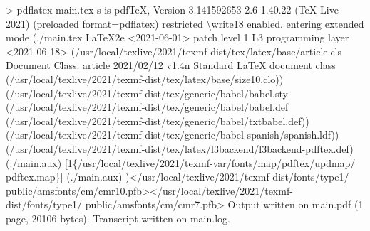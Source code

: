 \documentclass[
  letterpaper,
  DIV=11,
  numbers=noendperiod]{scrreport}
\newenvironment{Shaded}{\begin{snugshade}}{\end{snugshade}}
\newcommand{\BuiltInTok}[1]{\textcolor[rgb]{0.00,0.23,0.31}{#1}}
\newcommand{\DataTypeTok}[1]{\textcolor[rgb]{0.68,0.00,0.00}{#1}}
\newcommand{\ErrorTok}[1]{\textcolor[rgb]{0.68,0.00,0.00}{#1}}
\newcommand{\ExtensionTok}[1]{\textcolor[rgb]{0.00,0.23,0.31}{#1}}
\newcommand{\KeywordTok}[1]{\textcolor[rgb]{0.00,0.23,0.31}{#1}}
\newcommand{\NormalTok}[1]{\textcolor[rgb]{0.00,0.23,0.31}{#1}}
\newcommand{\OperatorTok}[1]{\textcolor[rgb]{0.37,0.37,0.37}{#1}}
\newcommand{\VariableTok}[1]{\textcolor[rgb]{0.07,0.07,0.07}{#1}}
\begin{document}
\begin{Shaded}
\begin{Highlighting}[]
\OperatorTok{\textgreater{}}\NormalTok{ pdflatex }\ExtensionTok{main.tex} 
\ExtensionTok{s}\NormalTok{ is pdfTeX, Version 3.141592653{-}2.6{-}1.40.22 }\ErrorTok{(}\ExtensionTok{TeX}\NormalTok{ Live 2021}\KeywordTok{)} \KeywordTok{(}\ExtensionTok{preloaded} 
\VariableTok{format}\OperatorTok{=}\NormalTok{pdflatex}\KeywordTok{)} \ExtensionTok{restricted} \DataTypeTok{\textbackslash{}w}\NormalTok{rite18 enabled.}
\ExtensionTok{entering}\NormalTok{ extended mode}
\KeywordTok{(}\ExtensionTok{./main.tex}
\ExtensionTok{LaTeX2e} \OperatorTok{\textless{}}\NormalTok{2021{-}06{-}01}\OperatorTok{\textgreater{}}\NormalTok{ patch level 1}
\ExtensionTok{L3}\NormalTok{ programming layer }\OperatorTok{\textless{}}\NormalTok{2021{-}06{-}18}\OperatorTok{\textgreater{}}
\KeywordTok{(}\ExtensionTok{/usr/local/texlive/2021/texmf{-}dist/tex/latex/base/article.cls}
\ExtensionTok{Document}\NormalTok{ Class: article 2021/02/12 v1.4n Standard LaTeX document class}
\KeywordTok{(}\ExtensionTok{/usr/local/texlive/2021/texmf{-}dist/tex/latex/base/size10.clo}\KeywordTok{))}
\KeywordTok{(}\ExtensionTok{/usr/local/texlive/2021/texmf{-}dist/tex/generic/babel/babel.sty}
\KeywordTok{(}\ExtensionTok{/usr/local/texlive/2021/texmf{-}dist/tex/generic/babel/babel.def}
\KeywordTok{(}\ExtensionTok{/usr/local/texlive/2021/texmf{-}dist/tex/generic/babel/txtbabel.def}\KeywordTok{))}
\KeywordTok{(}\ExtensionTok{/usr/local/texlive/2021/texmf{-}dist/tex/generic/babel{-}spanish/spanish.ldf}\KeywordTok{))}
\KeywordTok{(}\ExtensionTok{/usr/local/texlive/2021/texmf{-}dist/tex/latex/l3backend/l3backend{-}pdftex.def}\KeywordTok{)}
\KeywordTok{(}\ExtensionTok{./main.aux}\KeywordTok{)} \ExtensionTok{[1\{/usr/local/texlive/2021/texmf{-}var/fonts/map/pdftex/updmap/}
\ExtensionTok{pdftex.map\}]} \ErrorTok{(}\ExtensionTok{./main.aux}\KeywordTok{)} \KeywordTok{)}\OperatorTok{\textless{}}\NormalTok{/usr/local/texlive/2021/texmf{-}dist/fonts/type1/}
\ExtensionTok{public/amsfonts/cm/cmr10.pfb}\OperatorTok{\textgreater{}\textless{}}\NormalTok{/usr/local/texlive/2021/texmf{-}dist/fonts/type1/}
\ExtensionTok{public/amsfonts/cm/cmr7.pfb}\OperatorTok{\textgreater{}}
\ExtensionTok{Output}\NormalTok{ written on main.pdf }\ErrorTok{(}\ExtensionTok{1}\NormalTok{ page, 20106 bytes}\KeywordTok{)}\BuiltInTok{.}
\ExtensionTok{Transcript}\NormalTok{ written on main.log.}
\end{Highlighting}
\end{Shaded}
\end{document}
